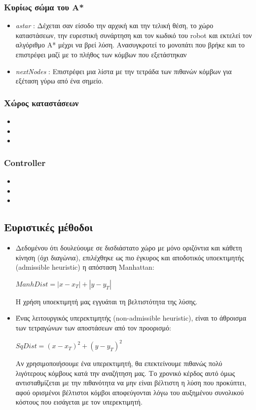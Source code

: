 \documentclass[a4paper,9pt]{article}
\begin{document}
\subsubsection{Κυρίως σώμα του Α*}
\begin{itemize}
	\item \emph{astar} : Δέχεται σαν είσοδο την αρχική και την τελική θέση, το χώρο
		καταστάσεων, την ευρεστική συνάρτηση και τον κωδικό του robot και εκτελεί
		τον αλγόριθμο Α* μέχρι να βρεί λύση. Ανασυγκροτεί το μονοπάτι που βρήκε
		και το επιστρέφει μαζί με το πλήθος των κόμβων που εξετάστηκαν
	\item \emph{nextNodes} : Επιστρέφει μια λίστα με την τετράδα των πιθανών
		κόμβων για εξέταση γύρω από ένα σημείο.
\end{itemize}
\subsubsection{Χώρος καταστάσεων}
\begin{itemize}
	\item
	\item
	\item
\end{itemize}
\subsubsection{Controller}
\begin{itemize}
	\item
	\item
	\item
\end{itemize}


\subsection{Ευριστικές μέθοδοι}
\begin{itemize}
	\item
		Δεδομένου ότι δουλεύουμε σε δισδιάστατο χώρο με μόνο οριζόντια και κάθετη
		κίνηση (όχι διαγώνια), επιλέχθηκε ως πιο έγκυρος και αποδοτικός υποεκτιμητής
		(admissible heuris{\kern0pt}tic) η απόσταση Manhattan:
		\begin{center} $ManhDist = |x - x_T| + |y - y_T|$ \end{center}
		Η χρήση υποεκτιμητή μας εγγυάται τη βελτιστότητα της λύσης.

	\item
		Ένας λειτουργικός υπερεκτιμητής (non-admissible heuris{\kern0pt}tic), είναι το άθροισμα
		των τετραγώνων των αποστάσεων από τον προορισμό:
		\begin{center} $SqDist = (x - x_T)^2 + (y - y_T)^2$ \end{center}
		Αν χρησιμοποιήσουμε ένα υπερεκτιμητή, θα επεκτείνουμε πιθανώς πολύ λιγότερους
		κόμβους κατά την αναζήτηση μας. Το χρονικό κέρδος αυτό όμως αντισταθμίζεται με
		την πιθανότητα να μην είναι βέλτιστη η λύση που προκύπτει, αφού ορισμένοι
		βέλτιστοι κόμβοι αποφεύγονται λόγω του αυξημένου συνολικού κόστους που
		εισάγεται με τον υπερεκτιμητή.
\end{itemize}
\end{document}
